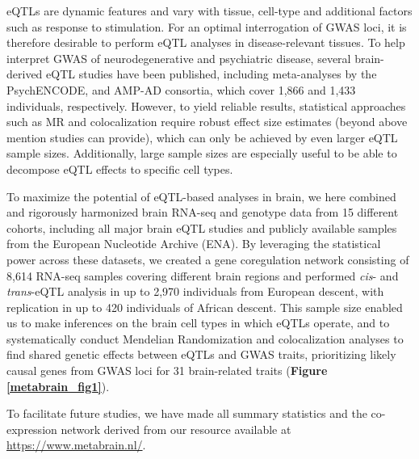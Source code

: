 eQTLs are dynamic features and vary with tissue, cell-type and additional factors such as response to stimulation. For an optimal interrogation of GWAS loci, it is therefore desirable to perform eQTL analyses in disease-relevant tissues\cite{donovanCellularDeconvolutionGTEx2020}. To help interpret GWAS of neurodegenerative and psychiatric disease, several brain-derived eQTL studies have been published, including meta-analyses by the PsychENCODE\cite{wangComprehensiveFunctionalGenomic2018}, and AMP-AD\cite{rajIntegrativeTranscriptomeAnalyses2018} consortia, which cover 1,866 and 1,433 individuals, respectively. However, to yield reliable results, statistical approaches such as MR and colocalization require robust effect size estimates (beyond above mention studies can provide), which can only be achieved by even larger eQTL sample sizes. Additionally, large sample sizes are especially useful to be able to decompose eQTL effects to specific cell types. 

To maximize the potential of eQTL-based analyses in brain, we here combined and rigorously harmonized brain RNA-seq and genotype data from 15 different cohorts, including all major brain eQTL studies and publicly available samples from the European Nucleotide Archive (ENA). By leveraging the statistical power across these datasets, we created a gene coregulation network consisting of 8,614 RNA-seq samples covering different brain regions and performed \textit{cis}- and \textit{trans}-eQTL analysis in up to 2,970 individuals from European descent, with replication in up to 420 individuals of African descent. This sample size enabled us to make inferences on the brain cell types in which eQTLs operate, and to systematically conduct Mendelian Randomization and colocalization analyses to find shared genetic effects between eQTLs and GWAS traits, prioritizing likely causal genes from GWAS loci for 31 brain-related traits (\textbf{Figure \ref{metabrain_fig1}}).   

To facilitate future studies, we have made all summary statistics and the co-expression network derived from our resource available at \url{https://www.metabrain.nl/}. 

